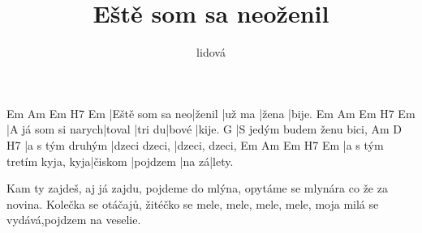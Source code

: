 \documentclass{song}
\title{Eště som sa neoženil}
\author{lidová}
\begin{document}
\strophe
Em              Am     Em     H7   Em
|Eště som sa neo|ženil |už ma |žena |bije.
Em                 Am     Em     H7   Em
|A já som si narych|toval |tri du|bové |kije.
G
|S jedým budem ženu bici,
Am              D             H7
|a s tým druhým |dzeci dzeci, |dzeci, dzeci,
Em                        Am      Em       H7   Em
|a s tým tretím kyja, kyja|čiskom |pojdzem |na zá|lety.
\endstrophe

\strophe*
Kam ty zajdeš, aj já zajdu, pojdeme do mlýna,
opytáme se mlynára co že za novina.
Kolečka se otáčajů,
žitéčko se mele, mele, mele, mele,
moja milá se vydává,pojdzem na veselie.
\endstrophe
\end{document}
